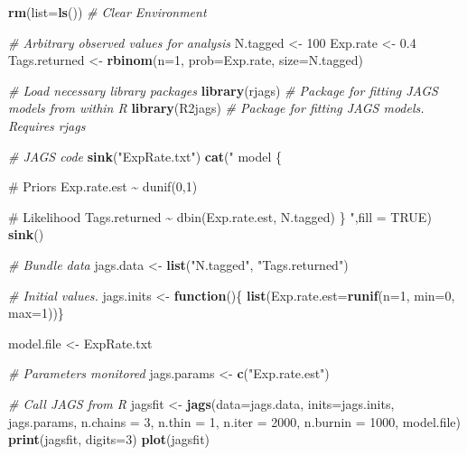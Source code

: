 \documentclass[
]{krantz}
\makeatletter
\newenvironment{Shaded}{\begin{snugshade}}{\end{snugshade}}
\newcommand{\AttributeTok}[1]{\textcolor[rgb]{0.27,0.27,0.27}{#1}}
\newcommand{\CommentTok}[1]{\textcolor[rgb]{0.37,0.37,0.37}{\textit{#1}}}
\newcommand{\ConstantTok}[1]{\textcolor[rgb]{0.37,0.37,0.37}{#1}}
\newcommand{\ControlFlowTok}[1]{\textcolor[rgb]{0.27,0.27,0.27}{\textbf{#1}}}
\newcommand{\DecValTok}[1]{\textcolor[rgb]{0.06,0.06,0.06}{#1}}
\newcommand{\FloatTok}[1]{\textcolor[rgb]{0.06,0.06,0.06}{#1}}
\newcommand{\FunctionTok}[1]{\textcolor[rgb]{0.27,0.27,0.27}{\textbf{#1}}}
\newcommand{\NormalTok}[1]{#1}
\newcommand{\OtherTok}[1]{\textcolor[rgb]{0.37,0.37,0.37}{#1}}
\newcommand{\StringTok}[1]{\textcolor[rgb]{0.5,0.5,0.5}{#1}}
\newenvironment{kframe}{%
\medskip{}
\setlength{\fboxsep}{.8em}
 \def\at@end@of@kframe{}%
 \ifinner\ifhmode%
  \def\at@end@of@kframe{\end{minipage}}%
  \begin{minipage}{\columnwidth}%
 \fi\fi%
 \def\FrameCommand##1{\hskip\@totalleftmargin \hskip-\fboxsep
 \colorbox{shadecolor}{##1}\hskip-\fboxsep
     \hskip-\linewidth \hskip-\@totalleftmargin \hskip\columnwidth}%
 \MakeFramed {\advance\hsize-\width
   \@totalleftmargin\z@ \linewidth\hsize
   \@setminipage}}%
 {\par\unskip\endMakeFramed%
 \at@end@of@kframe}
\renewenvironment{Shaded}{\begin{kframe}}{\end{kframe}}
\makeatother
\begin{document}
\begin{Shaded}
\begin{Highlighting}[]
\FunctionTok{rm}\NormalTok{(}\AttributeTok{list=}\FunctionTok{ls}\NormalTok{()) }\CommentTok{\# Clear Environment}

\CommentTok{\# Arbitrary \textquotesingle{}observed\textquotesingle{} values for analysis}
\NormalTok{N.tagged }\OtherTok{\textless{}{-}} \DecValTok{100}
\NormalTok{Exp.rate }\OtherTok{\textless{}{-}} \FloatTok{0.4}
\NormalTok{Tags.returned }\OtherTok{\textless{}{-}} \FunctionTok{rbinom}\NormalTok{(}\AttributeTok{n=}\DecValTok{1}\NormalTok{, }\AttributeTok{prob=}\NormalTok{Exp.rate, }\AttributeTok{size=}\NormalTok{N.tagged)}

\CommentTok{\# Load necessary library packages}
\FunctionTok{library}\NormalTok{(rjags)   }\CommentTok{\# Package for fitting JAGS models from within R}
\FunctionTok{library}\NormalTok{(R2jags)  }\CommentTok{\# Package for fitting JAGS models. Requires rjags}

\CommentTok{\# JAGS code}
\FunctionTok{sink}\NormalTok{(}\StringTok{"ExpRate.txt"}\NormalTok{)}
\FunctionTok{cat}\NormalTok{(}\StringTok{"}
\StringTok{    model \{}

\StringTok{    \# Priors}
\StringTok{    Exp.rate.est \textasciitilde{} dunif(0,1)}

\StringTok{    \# Likelihood}
\StringTok{    Tags.returned \textasciitilde{} dbin(Exp.rate.est, N.tagged)}
\StringTok{\}}
\StringTok{    "}\NormalTok{,}\AttributeTok{fill =} \ConstantTok{TRUE}\NormalTok{)}
\FunctionTok{sink}\NormalTok{()}

\CommentTok{\# Bundle data}
\NormalTok{jags.data }\OtherTok{\textless{}{-}} \FunctionTok{list}\NormalTok{(}\StringTok{"N.tagged"}\NormalTok{, }\StringTok{"Tags.returned"}\NormalTok{)}

\CommentTok{\# Initial values.}
\NormalTok{jags.inits }\OtherTok{\textless{}{-}} \ControlFlowTok{function}\NormalTok{()\{ }\FunctionTok{list}\NormalTok{(}\AttributeTok{Exp.rate.est=}\FunctionTok{runif}\NormalTok{(}\AttributeTok{n=}\DecValTok{1}\NormalTok{, }\AttributeTok{min=}\DecValTok{0}\NormalTok{, }\AttributeTok{max=}\DecValTok{1}\NormalTok{))\}}

\NormalTok{model.file }\OtherTok{\textless{}{-}} \StringTok{\textquotesingle{}ExpRate.txt\textquotesingle{}}

\CommentTok{\# Parameters monitored}
\NormalTok{jags.params }\OtherTok{\textless{}{-}} \FunctionTok{c}\NormalTok{(}\StringTok{"Exp.rate.est"}\NormalTok{)}

\CommentTok{\# Call JAGS from R}
\NormalTok{jagsfit }\OtherTok{\textless{}{-}} \FunctionTok{jags}\NormalTok{(}\AttributeTok{data=}\NormalTok{jags.data, }\AttributeTok{inits=}\NormalTok{jags.inits, jags.params,}
                \AttributeTok{n.chains =} \DecValTok{3}\NormalTok{, }\AttributeTok{n.thin =} \DecValTok{1}\NormalTok{, }\AttributeTok{n.iter =} \DecValTok{2000}\NormalTok{,}
                \AttributeTok{n.burnin =} \DecValTok{1000}\NormalTok{, model.file)}
\FunctionTok{print}\NormalTok{(jagsfit, }\AttributeTok{digits=}\DecValTok{3}\NormalTok{)}
\FunctionTok{plot}\NormalTok{(jagsfit)}
\end{Highlighting}
\end{Shaded}
\end{document}
